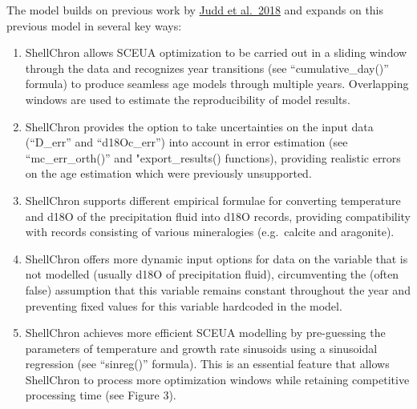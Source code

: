 \documentclass[
]{article}
\providecommand{\tightlist}{%
  \setlength{\itemsep}{0pt}\setlength{\parskip}{0pt}}
\begin{document}
The model builds on previous work by
\href{https://doi.org/10.1016/j.palaeo.2017.09.034}{Judd et al.~2018}
and expands on this previous model in several key ways:

\begin{enumerate}
\def\labelenumi{\arabic{enumi}.}
\tightlist
\item
  ShellChron allows SCEUA optimization to be carried out in a sliding
  window through the data and recognizes year transitions (see
  ``cumulative\_day()'' formula) to produce seamless age models through
  multiple years. Overlapping windows are used to estimate the
  reproducibility of model results.
\item
  ShellChron provides the option to take uncertainties on the input data
  (``D\_err'' and ``d18Oc\_err'') into account in error estimation (see
  ``mc\_err\_orth()'' and "export\_results() functions), providing
  realistic errors on the age estimation which were previously
  unsupported.
\item
  ShellChron supports different empirical formulae for converting
  temperature and d18O of the precipitation fluid into d18O records,
  providing compatibility with records consisting of various
  mineralogies (e.g.~calcite and aragonite).
\item
  ShellChron offers more dynamic input options for data on the variable
  that is not modelled (usually d18O of precipitation fluid),
  circumventing the (often false) assumption that this variable remains
  constant throughout the year and preventing fixed values for this
  variable hardcoded in the model.
\item
  ShellChron achieves more efficient SCEUA modelling by pre-guessing the
  parameters of temperature and growth rate sinusoids using a sinusoidal
  regression (see ``sinreg()'' formula). This is an essential feature
  that allows ShellChron to process more optimization windows while
  retaining competitive processing time (see Figure 3).
\end{enumerate}
\end{document}
